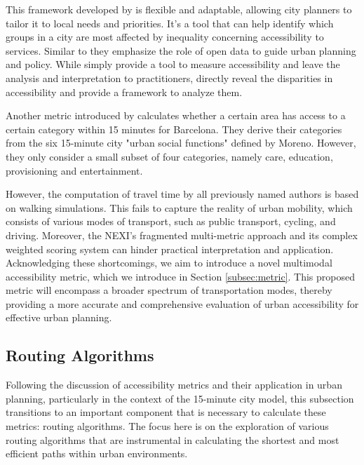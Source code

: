This framework developed by  is flexible and adaptable, allowing city planners to tailor it to local needs and priorities. 
It's a tool that can help identify which groups in a city are most affected by inequality concerning accessibility to services. 
Similar to  they emphasize the role of open data to guide urban planning and policy.
While  simply provide a tool to measure accessibility and leave the analysis and interpretation to practitioners,  directly reveal the disparities in accessibility and provide a framework to analyze them.

Another metric introduced by  calculates whether a certain area has access to a certain category within 15 minutes for Barcelona.
They derive their categories from the six 15-minute city "urban social functions" defined by Moreno.
However, they only consider a small subset of four categories, namely care, education, provisioning and entertainment.

However, the computation of travel time by all previously named authors is based on walking simulations. 
This fails to capture the reality of urban mobility, which consists of various modes of transport, such as public transport, cycling, and driving.
Moreover, the NEXI's fragmented multi-metric approach and its complex weighted scoring system can hinder practical interpretation and application.
Acknowledging these shortcomings, we aim to introduce a novel multimodal accessibility metric, which we introduce in Section \ref{subsec:metric}.
This proposed metric will encompass a broader spectrum of transportation modes, thereby providing a more accurate and comprehensive evaluation of urban accessibility for effective urban planning.

\subsection{Routing Algorithms}
\label{subsec:routing_algorithms}

Following the discussion of accessibility metrics and their application in urban planning, particularly in the context of the 15-minute city model, this subsection transitions to an important component that is necessary to calculate these metrics: routing algorithms.
The focus here is on the exploration of various routing algorithms that are instrumental in calculating the shortest and most efficient paths within urban environments. 

